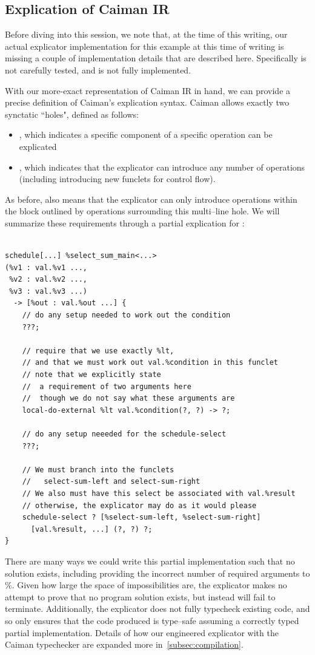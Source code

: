 \subsection{Explication of Caiman IR}

Before diving into this session, we note that, at the time of this writing, our actual explicator implementation for this example at this time of writing is missing a couple of implementation details that are described here.  Specifically  is not carefully tested, and  is not fully implemented.

With our more-exact representation of Caiman IR in hand, we can provide a precise definition of Caiman's explication syntax.  Caiman allows exactly two synctatic ``holes", defined as follows:
%
\begin{itemize}
\item {}, which indicates a specific component of a specific operation can be explicated
\item {}, which indicates that the explicator can introduce any number of operations (including introducing new funclets for control flow).
\end{itemize}
%
As before,  also means that the explicator can only introduce operations within the block outlined by operations surrounding this multi--line hole.  We will summarize these requirements through a partial explication for :
%
\begin{lstlisting}

schedule[...] %select_sum_main<...>
(%v1 : val.%v1 ..., 
 %v2 : val.%v2 ..., 
 %v3 : val.%v3 ...) 
  -> [%out : val.%out ...] {
    // do any setup needed to work out the condition
    ???;
  
    // require that we use exactly %lt, 
    // and that we must work out val.%condition in this funclet
    // note that we explicitly state 
    //  a requirement of two arguments here
    //  though we do not say what these arguments are
    local-do-external %lt val.%condition(?, ?) -> ?;
    
    // do any setup neeeded for the schedule-select
    ???;
    
    // We must branch into the funclets 
    //   select-sum-left and select-sum-right
    // We also must have this select be associated with val.%result
    // otherwise, the explicator may do as it would please
    schedule-select ? [%select-sum-left, %select-sum-right]
      [val.%result, ...] (?, ?) ?;
}
\end{lstlisting}
%
There are many ways we could write this partial implementation such that no solution exists, including providing the incorrect number of required arguments to \%.  Given how large the space of impossibilities are, the explicator makes no attempt to prove that no program solution exists, but instead will fail to terminate.  Additionally, the explicator does not fully typecheck existing code, and so only ensures that the code produced is type--safe assuming a correctly typed partial implementation.  Details of how our engineered explicator with the Caiman typechecker are expanded more in~\ref{subsec:compilation}.

